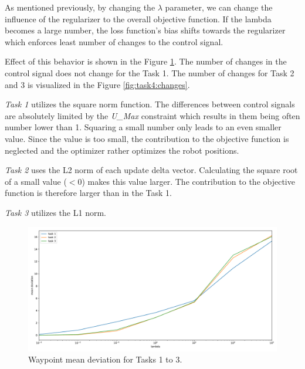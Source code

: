 As mentioned previously, by changing the $\lambda$ parameter, we can change the influence of the regularizer to the overall objective function. If the lambda becomes a large number, the loss function's bias shifts towards the regularizer which enforces least number of changes to the control signal.

Effect of this behavior is shown in the Figure \ref{fig:task4:waypoint:dev}. The number of changes in the control signal does not change for the Task 1. The number of changes for Task 2 and 3 is visualized in the Figure \ref{fig:task4:changes}.

\emph{Task 1} utilizes the square norm function. The differences between control signals are absolutely limited by the \textit{U\_Max} constraint which results in them being often number lower than 1. Squaring a small number only leads to an even smaller value. Since the value is too small, the contribution to the objective function is neglected and the optimizer rather optimizes the robot positions. 

\emph{Task 2} uses the L2 norm of each update delta vector. Calculating the square root of a small value ($<0$) makes this value larger. The contribution to the objective function is therefore larger than in the Task 1. 

\emph{Task 3} utilizes the L1 norm. 

\begin{figure}[!htb]
    \centering
    \includegraphics[width=\linewidth]{part1/notebooks/task_1_2_3_waypoint_mean_dev.pdf}
    \caption{Waypoint mean deviation for Tasks 1 to 3.}
    \label{fig:task4:waypoint:dev}
\end{figure}

